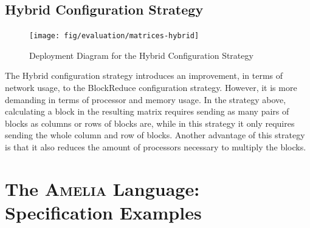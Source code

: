 \documentclass{article}
\newcommand\amelia[0]{\textsc{Amelia}}
\begin{document}
\subsection{Hybrid Configuration Strategy}

\begin{figure}[H]
	\centering
	\texttt{[image: fig/evaluation/matrices-hybrid]}
	\caption[]{Deployment Diagram for the Hybrid Configuration Strategy}
	\label{fig:apx-eval-amelia-hybrid}
\end{figure}

The Hybrid configuration strategy introduces an improvement, in terms of network usage, to the BlockReduce configuration strategy. However, it is more demanding in terms of processor and memory usage. In the strategy above, calculating a block in the resulting matrix requires sending as many pairs of blocks as columns or rows of blocks are, while in this strategy it only requires sending the whole column and row of blocks. Another advantage of this strategy is that it also reduces the amount of processors necessary to multiply the blocks.

\section{The \amelia{} Language: Specification Examples}
\end{document}
